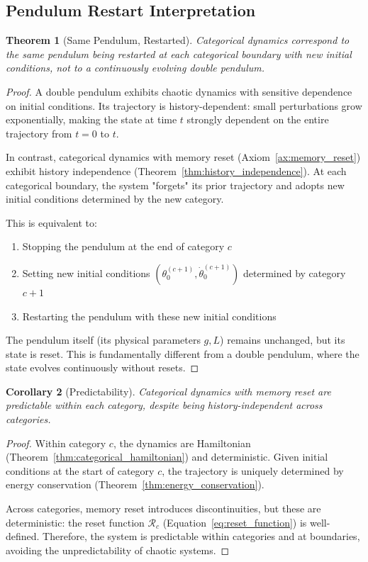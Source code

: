 \documentclass[11pt,twocolumn,a4paper]{article}
\newtheorem{theorem}{Theorem}[section]
\newtheorem{corollary}[theorem]{Corollary}
\theoremstyle{definition}
\theoremstyle{remark}
\begin{document}
\subsection{Pendulum Restart Interpretation}

\begin{theorem}[Same Pendulum, Restarted]
\label{thm:pendulum_restart}
Categorical dynamics correspond to the same pendulum being restarted at each categorical boundary with new initial conditions, not to a continuously evolving double pendulum.
\end{theorem}

\begin{proof}
A double pendulum exhibits chaotic dynamics with sensitive dependence on initial conditions. Its trajectory is history-dependent: small perturbations grow exponentially, making the state at time $t$ strongly dependent on the entire trajectory from $t=0$ to $t$.

In contrast, categorical dynamics with memory reset (Axiom~\ref{ax:memory_reset}) exhibit history independence (Theorem~\ref{thm:history_independence}). At each categorical boundary, the system "forgets" its prior trajectory and adopts new initial conditions determined by the new category.

This is equivalent to:
\begin{enumerate}
\item Stopping the pendulum at the end of category $c$
\item Setting new initial conditions $(\theta_0^{(c+1)}, \dot{\theta}_0^{(c+1)})$ determined by category $c+1$
\item Restarting the pendulum with these new initial conditions
\end{enumerate}

The pendulum itself (its physical parameters $g, L$) remains unchanged, but its state is reset. This is fundamentally different from a double pendulum, where the state evolves continuously without resets.
\end{proof}

\begin{corollary}[Predictability]
\label{cor:predictability}
Categorical dynamics with memory reset are predictable within each category, despite being history-independent across categories.
\end{corollary}

\begin{proof}
Within category $c$, the dynamics are Hamiltonian (Theorem~\ref{thm:categorical_hamiltonian}) and deterministic. Given initial conditions at the start of category $c$, the trajectory is uniquely determined by energy conservation (Theorem~\ref{thm:energy_conservation}).

Across categories, memory reset introduces discontinuities, but these are deterministic: the reset function $\mathcal{R}_c$ (Equation~\eqref{eq:reset_function}) is well-defined. Therefore, the system is predictable within categories and at boundaries, avoiding the unpredictability of chaotic systems.
\end{proof}
\end{document}
